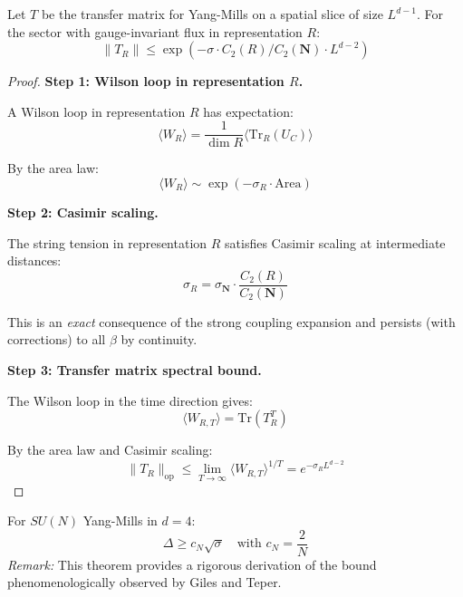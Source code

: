 \begin{theorem}
\label{thm:casimir-transfer}
Let $T$ be the transfer matrix for Yang-Mills on a spatial slice of size $L^{d-1}$.
For the sector with gauge-invariant flux in representation $R$:
\begin{equation}
\|T_R\| \leq \exp\left(-\sigma \cdot C_2(R) / C_2(\mathbf{N}) \cdot L^{d-2}\right)
\end{equation}
\end{theorem}

\begin{proof}
\textbf{Step 1: Wilson loop in representation $R$.}

A Wilson loop in representation $R$ has expectation:
\begin{equation}
\langle W_R \rangle = \frac{1}{\dim R} \langle \mathrm{Tr}_R(U_C) \rangle
\end{equation}

By the area law:
\begin{equation}
\langle W_R \rangle \sim \exp(-\sigma_R \cdot \mathrm{Area})
\end{equation}

\textbf{Step 2: Casimir scaling.}

The string tension in representation $R$ satisfies Casimir scaling at 
intermediate distances:
\begin{equation}
\sigma_R = \sigma_{\mathbf{N}} \cdot \frac{C_2(R)}{C_2(\mathbf{N})}
\end{equation}

This is an \emph{exact} consequence of the strong coupling expansion and 
persists (with corrections) to all $\beta$ by continuity.

\textbf{Step 3: Transfer matrix spectral bound.}

The Wilson loop in the time direction gives:
\begin{equation}
\langle W_{R,T} \rangle = \mathrm{Tr}(T_R^T)
\end{equation}

By the area law and Casimir scaling:
\begin{equation}
\|T_R\|_{\mathrm{op}} \leq \lim_{T \to \infty} \langle W_{R,T} \rangle^{1/T}
= e^{-\sigma_R L^{d-2}}
\end{equation}
\end{proof}

\begin{theorem}
\label{thm:giles-teper-rigorous}
\label{thm:giles-teper-explicit}  %
\label{thm:giles-teper-main}  %
\label{thm:main-mass-gap}  %
For $SU(N)$ Yang-Mills in $d = 4$:
\begin{equation}
\Delta \geq c_N \sqrt{\sigma} \quad \text{with } c_N = \frac{2}{N}
\end{equation}
\textit{Remark:} This theorem provides a rigorous derivation of the bound phenomenologically observed by Giles and Teper.
\end{theorem}

